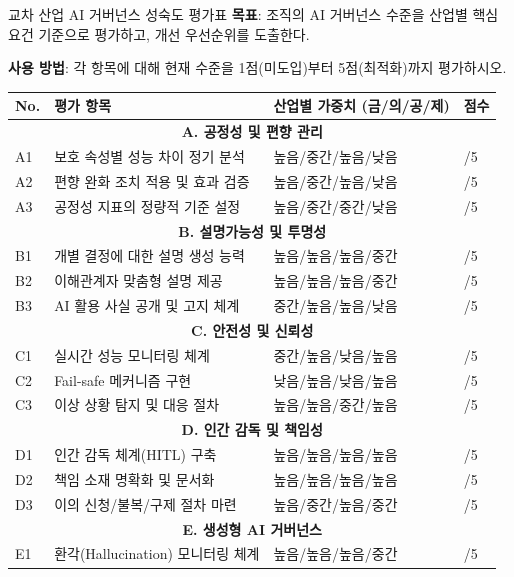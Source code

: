 \begin{practicaltool}{교차 산업 AI 거버넌스 성숙도 평가표}
\textbf{목표}: 조직의 AI 거버넌스 수준을 산업별 핵심 요건 기준으로 평가하고,
개선 우선순위를 도출한다.

\textbf{사용 방법}: 각 항목에 대해 현재 수준을 1점(미도입)부터
5점(최적화)까지 평가하시오.

\begin{table}[htbp]
\centering
\begin{tabularx}{\textwidth}{|p{0.5cm}|p{5cm}|X|p{1.2cm}|}
\hline
\textbf{No.} & \textbf{평가 항목} & \textbf{산업별 가중치 (금/의/공/제)} & \textbf{점수} \\
\hline
\multicolumn{4}{|c|}{\textbf{A. 공정성 및 편향 관리}} \\
\hline
A1 & 보호 속성별 성능 차이 정기 분석 & 높음/중간/높음/낮음 & /5 \\
\hline
A2 & 편향 완화 조치 적용 및 효과 검증 & 높음/중간/높음/낮음 & /5 \\
\hline
A3 & 공정성 지표의 정량적 기준 설정 & 높음/중간/중간/낮음 & /5 \\
\hline
\multicolumn{4}{|c|}{\textbf{B. 설명가능성 및 투명성}} \\
\hline
B1 & 개별 결정에 대한 설명 생성 능력 & 높음/높음/높음/중간 & /5 \\
\hline
B2 & 이해관계자 맞춤형 설명 제공 & 높음/높음/높음/중간 & /5 \\
\hline
B3 & AI 활용 사실 공개 및 고지 체계 & 중간/높음/높음/낮음 & /5 \\
\hline
\multicolumn{4}{|c|}{\textbf{C. 안전성 및 신뢰성}} \\
\hline
C1 & 실시간 성능 모니터링 체계 & 중간/높음/낮음/높음 & /5 \\
\hline
C2 & Fail-safe 메커니즘 구현 & 낮음/높음/낮음/높음 & /5 \\
\hline
C3 & 이상 상황 탐지 및 대응 절차 & 높음/높음/중간/높음 & /5 \\
\hline
\multicolumn{4}{|c|}{\textbf{D. 인간 감독 및 책임성}} \\
\hline
D1 & 인간 감독 체계(HITL) 구축 & 높음/높음/높음/높음 & /5 \\
\hline
D2 & 책임 소재 명확화 및 문서화 & 높음/높음/높음/높음 & /5 \\
\hline
D3 & 이의 신청/불복/구제 절차 마련 & 높음/중간/높음/중간 & /5 \\
\hline
\multicolumn{4}{|c|}{\textbf{E. 생성형 AI 거버넌스}} \\
\hline
E1 & 환각(Hallucination) 모니터링 체계 & 높음/높음/높음/중간 & /5 \\

\end{tabularx}
\end{table}
\end{practicaltool}
